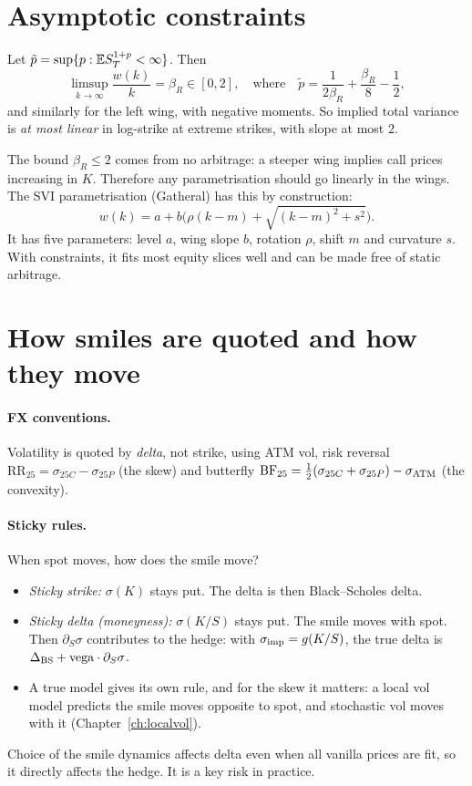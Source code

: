 \section{Asymptotic constraints}

\begin{theorem}\label{thm:lee}
Let $\tilde p=\sup\{p:\mathbb{E} S_T^{1+p}<\infty\}$. Then
\[
\limsup_{k\to\infty}\frac{w(k)}{k}=\beta_R\in[0,2],\quad\text{where}\quad\tilde p=\frac{1}{2\beta_R}+\frac{\beta_R}{8}-\frac12,
\]
and similarly for the left wing, with negative moments. So implied total variance is \emph{at most linear} in log-strike at extreme strikes, with slope at most $2$.
\end{theorem}

The bound $\beta_R\le2$ comes from no arbitrage: a steeper wing implies call prices increasing in $K$. Therefore any parametrisation should go linearly in the wings. The SVI parametrisation (Gatheral) has this by construction:
\[
w(k)=a+b\bigl(\rho(k-m)+\sqrt{(k-m)^2+s^2}\bigr).
\]
It has five parameters: level $a$, wing slope $b$, rotation $\rho$, shift $m$ and curvature $s$. With constraints, it fits most equity slices well and can be made free of static arbitrage.

\section{How smiles are quoted and how they move}

\paragraph{FX conventions.} Volatility is quoted by \emph{delta}, not strike, using ATM vol, risk reversal $\mathrm{RR}_{25}=\sigma_{25C}-\sigma_{25P}$ (the skew) and butterfly $\mathrm{BF}_{25}=\tfrac12(\sigma_{25C}+\sigma_{25P})-\sigma_{\rm ATM}$ (the convexity).

\paragraph{Sticky rules.} When spot moves, how does the smile move?
\begin{itemize}
\item \emph{Sticky strike:} $\sigma(K)$ stays put. The delta is then Black--Scholes delta.
\item \emph{Sticky delta (moneyness):} $\sigma(K/S)$ stays put. The smile moves with spot. Then $\partial_S\sigma$ contributes to the hedge: with $\sigma_{\rm imp}=g(K/S)$, the true delta is $\Delta_{\rm BS}+\text{vega}\cdot\partial_S\sigma$.
\item A true model gives its own rule, and for the skew it matters: a local vol model predicts the smile moves opposite to spot, and stochastic vol moves with it (Chapter~\ref{ch:localvol}).
\end{itemize}
Choice of the smile dynamics affects delta even when all vanilla prices are fit, so it directly affects the hedge. It is a key risk in practice.

